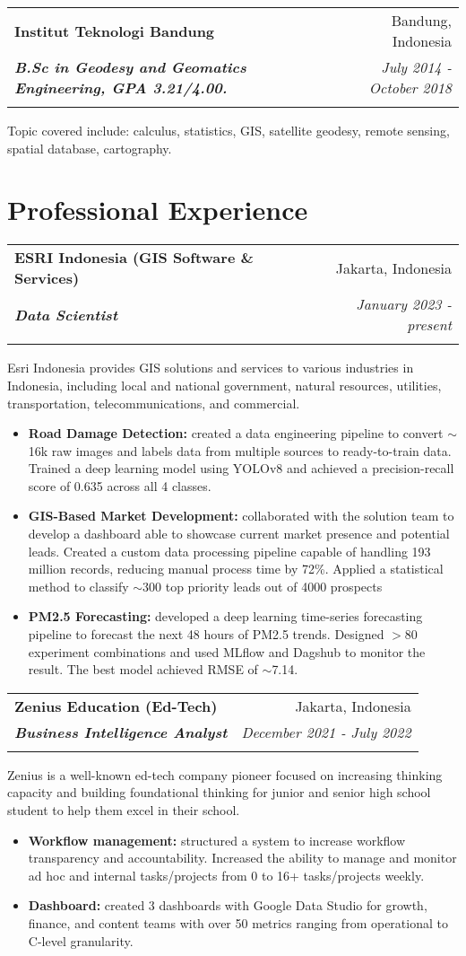 \documentclass[a4paper, 11pt]{article}
\makeatletter
\newcommand{\resumeItem}[2]{
    \item\small{
        \textbf{#1}{#2 \vspace{-2pt}}
    }
}
\newcommand{\resumeSubheading}[4]{
    \vspace{-1pt}
    \begin{tabular*}{\textwidth}{l@{\extracolsep{\fill}}r}
        \color{lightblue}\textbf{#1} & #2 \\
        \textbf{\textit{\small#3}} & \textit{\small #4} \\
        \textnormal{}\vspace{-5pt}
    \end{tabular*}\vspace{-5pt}
}
\newcommand{\resumeItemListStart}{\begin{itemize}[leftmargin=*]\setlength\itemsep{0em}\vspace{-1pt}}
\newcommand{\resumeItemListEnd}{\end{itemize}\vspace{-5pt}}
\makeatother
\begin{document}
    \vspace{5pt}
    \resumeSubheading
    {Institut Teknologi Bandung}
    {Bandung, Indonesia}
    {B.Sc in Geodesy and Geomatics Engineering, GPA 3.21/4.00.}
    {July 2014 - October 2018}
    \small{Topic covered include: calculus, statistics, GIS, satellite geodesy, 
    remote sensing, spatial database, cartography.}
	
    \vspace{-15pt}
    \section{Professional Experience}
    \resumeSubheading
    {ESRI Indonesia (GIS Software \& Services)}{Jakarta, Indonesia}
    {Data Scientist}{January 2023 - present}
    \small{Esri Indonesia provides GIS solutions and services to various industries in 
    Indonesia, including local and national government, natural resources, utilities, 
    transportation, telecommunications, and commercial.}
    \vspace{-1pt}
    \resumeItemListStart
    \resumeItem{Road Damage Detection:}{ created a data engineering pipeline to convert $\sim$16k raw images and labels data from multiple sources to ready-to-train data. Trained a deep learning model using YOLOv8 and achieved a precision-recall score of 0.635 across all 4 classes.}
    \resumeItem{GIS-Based Market Development:}{ collaborated with the solution team to 
    develop a dashboard able to showcase current market presence and potential leads. 
    Created a custom data processing pipeline capable of handling 193 million records, 
    reducing manual process time by 72\%. Applied a statistical method to classify 
    $\sim$300 top priority leads out of 4000 prospects
    }
    \resumeItem{PM2.5 Forecasting:}{ developed a deep learning time-series forecasting pipeline to forecast the next 48 hours of PM2.5 trends. Designed $>$80 experiment combinations and used MLflow and Dagshub to monitor the result. The best model achieved RMSE of $\sim$7.14.
    }
    \resumeItemListEnd

    \vspace{5pt}
    \resumeSubheading
    {Zenius Education (Ed-Tech)}
    {Jakarta, Indonesia}
    {Business Intelligence Analyst}
    {December 2021 - July 2022}
    \small{Zenius is a well-known ed-tech company pioneer focused on increasing thinking 
    capacity and building foundational thinking for junior and senior high school 
    student to help them excel in their school.}
    \vspace{-1pt}
    \resumeItemListStart
    \resumeItem{Workflow management:}{ structured a system to increase 
    workflow transparency and accountability. Increased the ability to manage 
    and monitor ad hoc and internal tasks/projects from 0 to 
    16+ tasks/projects weekly.}
    \resumeItem{Dashboard:}{ created 3 dashboards with Google Data Studio for growth, finance, and content teams with over 50 metrics ranging from operational to C-level granularity.}
    \resumeItemListEnd
\end{document}
